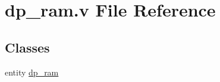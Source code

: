 \hypertarget{dp__ram_8v}{}\section{dp\+\_\+ram.\+v File Reference}
\label{dp__ram_8v}
\subsection*{Classes}
\begin{DoxyCompactItemize}
\item 
entity \mbox{\hyperlink{enumdp__ram}{dp\+\_\+ram}}
\end{DoxyCompactItemize}
